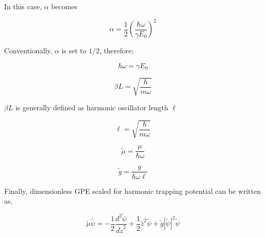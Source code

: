 \documentclass[a4paper,times,hidelinks,12pt]{article}
\begin{document}
In this case, $\alpha$ becomes

$$ \alpha =  \frac{1}{2} \left(\frac{\hbar \omega}{\gamma E_0}\right)^2 $$

Conventionally, $\alpha$ is set to $1/2$, therefore;

$$ \hbar \omega = \gamma E_0 $$

$$ \beta L = \sqrt{\frac{\hbar}{m\omega}} $$ 

$ \beta L $ is generally defined as harmonic oscillator length $\ell$

$$ \ell = \sqrt{\frac{\hbar}{m\omega}} $$ 

$$ \widetilde{\mu} = \frac{\mu}{\hbar \omega} $$ 

$$ \widetilde{g} = \frac{g}{\hbar \omega \ell} $$

Finally, dimensionless GPE scaled for harmonic trapping potential can be written as,

$$\widetilde{\mu} \widetilde{\psi} = -\frac{1}{2}\frac{d^2\widetilde{\psi}}{d\widetilde{z}^2} + \frac{1}{2}\widetilde{z}^2\widetilde{\psi} + \widetilde{g}|\widetilde{\psi}|^2 \widetilde{\psi} $$
\end{document}
